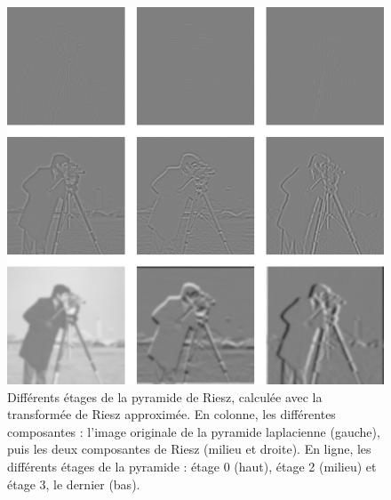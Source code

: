 \bigskip

\begin{figure}
    \centering
    \includegraphics[width=.65\textwidth]{contenu/resources/images/riesz_pyramid_cameraman}
    \caption[Pyramide de Riesz]{Différents étages de la pyramide de Riesz, calculée avec la transformée de Riesz approximée. En colonne, les différentes composantes : l'image originale de la pyramide laplacienne (gauche), puis les deux composantes de Riesz (milieu et droite). En ligne, les différents étages de la pyramide : étage 0 (haut), étage 2 (milieu) et étage 3, le dernier (bas).}
    \label{fig:riesz-pyramid-cameraman}
\end{figure}

